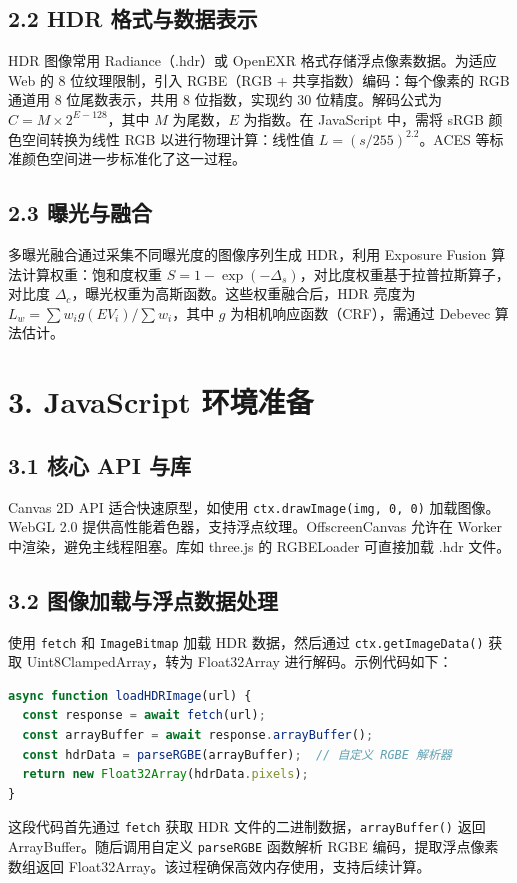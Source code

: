 \section{2.2 HDR 格式与数据表示}
HDR 图像常用 Radiance（.hdr）或 OpenEXR 格式存储浮点像素数据。为适应 Web 的 8 位纹理限制，引入 RGBE（RGB + 共享指数）编码：每个像素的 RGB 通道用 8 位尾数表示，共用 8 位指数，实现约 30 位精度。解码公式为 $C = M \times 2^{E-128}$，其中 $M$ 为尾数，$E$ 为指数。在 JavaScript 中，需将 sRGB 颜色空间转换为线性 RGB 以进行物理计算：线性值 $L = (s/255)^{2.2}$。ACES 等标准颜色空间进一步标准化了这一过程。\par
\section{2.3 曝光与融合}
多曝光融合通过采集不同曝光度的图像序列生成 HDR，利用 Exposure Fusion 算法计算权重：饱和度权重 $S = 1 - \exp(-\Delta_s)$，对比度权重基于拉普拉斯算子，对比度 $\Delta_c$，曝光权重为高斯函数。这些权重融合后，HDR 亮度为 $L_w = \sum w_i g(EV_i) / \sum w_i$，其中 $g$ 为相机响应函数（CRF），需通过 Debevec 算法估计。\par
\chapter{3. JavaScript 环境准备}
\section{3.1 核心 API 与库}
Canvas 2D API 适合快速原型，如使用 \texttt{ctx.drawImage(img, 0, 0)} 加载图像。WebGL 2.0 提供高性能着色器，支持浮点纹理。OffscreenCanvas 允许在 Worker 中渲染，避免主线程阻塞。库如 three.js 的 RGBELoader 可直接加载 .hdr 文件。\par
\section{3.2 图像加载与浮点数据处理}
使用 \texttt{fetch} 和 \texttt{ImageBitmap} 加载 HDR 数据，然后通过 \texttt{ctx.getImageData()} 获取 Uint8ClampedArray，转为 Float32Array 进行解码。示例代码如下：\par
\begin{lstlisting}[language=javascript]
async function loadHDRImage(url) {
  const response = await fetch(url);
  const arrayBuffer = await response.arrayBuffer();
  const hdrData = parseRGBE(arrayBuffer);  // 自定义 RGBE 解析器
  return new Float32Array(hdrData.pixels);
}
\end{lstlisting}
这段代码首先通过 \texttt{fetch} 获取 HDR 文件的二进制数据，\texttt{arrayBuffer()} 返回 ArrayBuffer。随后调用自定义 \texttt{parseRGBE} 函数解析 RGBE 编码，提取浮点像素数组返回 Float32Array。该过程确保高效内存使用，支持后续计算。\par
